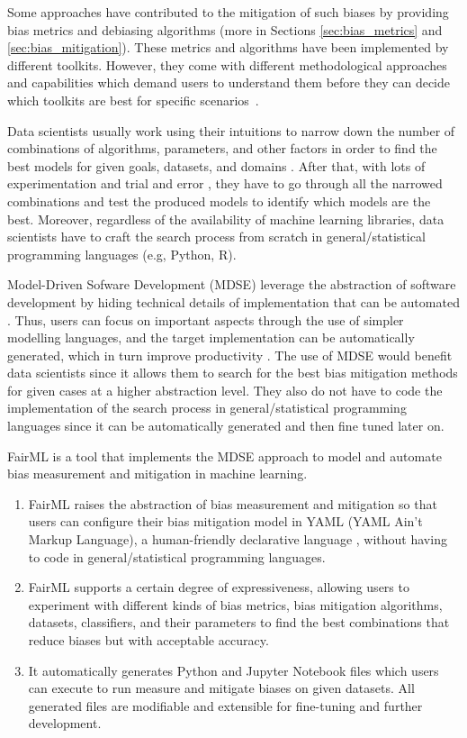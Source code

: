 \documentclass[sigconf,review]{acmart}
\begin{document}
Some approaches have contributed to the mitigation of such biases by providing bias metrics and debiasing algorithms (more in Sections \ref{sec:bias_metrics} and \ref{sec:bias_mitigation}). 
These metrics and algorithms have been implemented by different toolkits.
However, they come with different methodological approaches and capabilities which demand users to understand them before they can decide which toolkits are best for specific scenarios~\cite{lee2021landscape}.  

Data scientists usually work using their intuitions to narrow down the number of combinations of algorithms, parameters, and other factors in order to find the best models for given goals, datasets, and domains \cite{muller2016introduction}. After that, with lots of experimentation and trial and error \cite{byrne2017development}, they have to go through all the narrowed combinations and test the produced models to identify which models are the best. Moreover, regardless of the availability of machine learning libraries, data scientists have to craft the search process from scratch in general/statistical programming languages (e.g, Python, R).

Model-Driven Sofware Development (MDSE) leverage the abstraction of software development by hiding technical details of implementation that can be automated \cite{brambilla2017model}. Thus, users can focus on important aspects through the use of simpler modelling languages, and the target implementation can be automatically generated, which in turn improve productivity \cite{volter2013model}. The use of MDSE would benefit data scientists since it allows them to search for the best bias mitigation methods for given cases at a higher abstraction level. They also do not have to code the implementation of the search process in general/statistical programming languages since it can be automatically generated and then fine tuned later on. 

FairML is a tool that implements the MDSE approach to model and automate bias measurement and mitigation in machine learning. 
\begin{enumerate}
	\item FairML raises the abstraction of bias measurement and mitigation so that users can configure their bias mitigation model in YAML (YAML Ain’t Markup Language), a human-friendly declarative language \cite{evans2017yaml}, without having to code in general/statistical programming languages.
	\item FairML supports a certain degree of expressiveness, allowing users to experiment with different kinds of bias metrics, bias mitigation algorithms, datasets, classifiers, and their parameters to find the best combinations that reduce biases but with acceptable accuracy.
	\item It automatically generates Python and Jupyter Notebook files which users can execute to run measure and mitigate biases on given datasets. All generated files are modifiable and extensible for fine-tuning and further development.
\end{enumerate}
\end{document}
